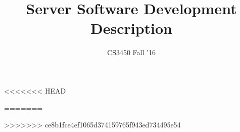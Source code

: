 \documentclass[12pt]{article}
\title{Server Software Development Description}
\date{}
\author{CS3450 Fall '16}
\begin{document}
\maketitle

<<<<<<< HEAD

=======

>>>>>>> ce8b1fce4ef1065d374159765f943ed734495e54
\end{document}
